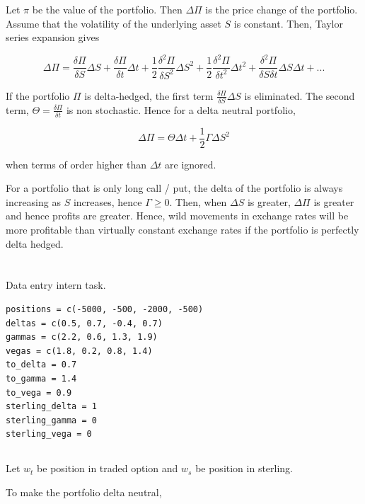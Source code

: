 \documentclass[11pt]{scrartcl}
\newcommand{\defrac}[2]{\ensuremath{\frac{\delta #1}{\delta #2}}}
\newcommand{\dedefrac}[2]{\ensuremath{\frac{\delta^2 #1}{\delta #2^2}}}
\newcommand{\dededefrac}[3]{\ensuremath{\frac{\delta^2 #1}{\delta #2 \delta #3}}}
\begin{document}
\section{}

Let $\pi$ be the value of the portfolio. Then $\Delta \Pi$ is the price change of the portfolio. Assume that the volatility of the underlying asset $S$ is constant. Then, Taylor series expansion gives

\[\Delta \Pi = \defrac{\Pi}{S} \Delta S + \defrac{\Pi}{t} \Delta t + \frac{1}{2}\dedefrac{\Pi}{S} \Delta S^2 + \frac{1}{2}\dedefrac{\Pi}{t}\Delta t^2 + \dededefrac{\Pi}{S}{t} \Delta S \Delta t + ...\]

If the portfolio $\Pi$ is delta-hedged, the first term $\defrac{\Pi}{S}\Delta S$ is eliminated. The second term, $\Theta = \defrac{\Pi}{t}$ is non stochastic. Hence for a delta neutral portfolio,

\[\Delta \Pi = \Theta \Delta t + \frac{1}{2}\Gamma \Delta S^2\]

when terms of order higher than $\Delta t$ are ignored.

For a portfolio that is only long call / put, the delta of the portfolio is always increasing as $S$ increases, hence $\Gamma \geq 0$. Then, when $\Delta S$ is greater, $\Delta \Pi$ is greater and hence profits are greater. Hence, wild movements in exchange rates will be more profitable than virtually constant exchange rates if the portfolio is perfectly delta hedged.

\section{}

Data entry intern task.

\begin{lstlisting}
positions = c(-5000, -500, -2000, -500)
deltas = c(0.5, 0.7, -0.4, 0.7)
gammas = c(2.2, 0.6, 1.3, 1.9)
vegas = c(1.8, 0.2, 0.8, 1.4)
to_delta = 0.7
to_gamma = 1.4
to_vega = 0.9
sterling_delta = 1
sterling_gamma = 0
sterling_vega = 0
\end{lstlisting}

\subsection{}

Let $w_t$ be position in traded option and $w_s$ be position in sterling.

To make the portfolio delta neutral,
\end{document}
